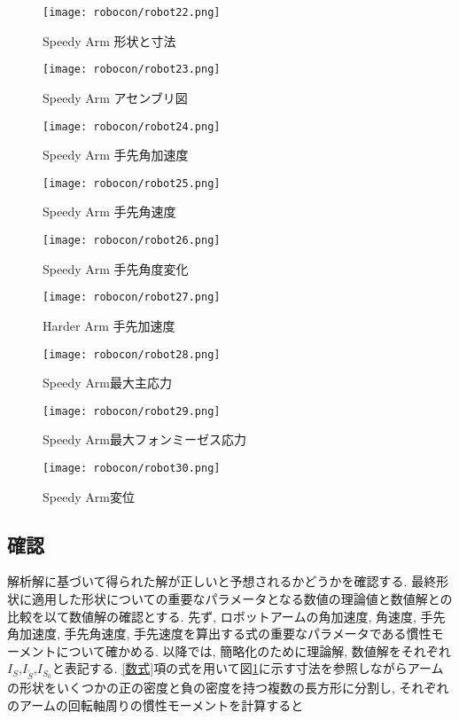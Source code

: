\documentclass[10pt,b5paper,papersize,dvipdfmx]{jsbook}
\begin{document}
\begin{figure}[htbp]
  \centering
  \texttt{[image: robocon/robot22.png]}
  \caption{Speedy Arm 形状と寸法}
  \label{fig:Speedy Arm 形状と寸法}
\end{figure}
\begin{figure}[htbp]
  \centering
  \texttt{[image: robocon/robot23.png]}
  \caption{Speedy Arm アセンブリ図}
  \label{fig:Speedy Arm アセンブリ図}
\end{figure}
\begin{figure}[htbp]
  \centering
  \texttt{[image: robocon/robot24.png]}
  \caption{Speedy Arm 手先角加速度}
  \label{fig:Speedy Arm 手先角加速度}
\end{figure}
\begin{figure}[htbp]
  \centering
  \texttt{[image: robocon/robot25.png]}
  \caption{Speedy Arm 手先角速度}
  \label{fig:Speedy Arm 手先角速度}
\end{figure}
\begin{figure}[htbp]
  \centering
  \texttt{[image: robocon/robot26.png]}
  \caption{Speedy Arm 手先角度変化}
  \label{fig:Speedy Arm 手先角度変化}
\end{figure}
\begin{figure}[htbp]
  \centering
  \texttt{[image: robocon/robot27.png]}
  \caption{Harder Arm 手先加速度}
  \label{fig:Harder Arm 手先加速度2}
\end{figure}
\begin{figure}[htbp]
  \centering
  \texttt{[image: robocon/robot28.png]}
  \caption{Speedy Arm最大主応力}
  \label{fig:Speedy Arm最大主応力}
\end{figure}
\begin{figure}[htbp]
  \centering
  \texttt{[image: robocon/robot29.png]}
  \caption{Speedy Arm最大フォンミーゼス応力}
  \label{fig:Speedy Arm最大フォンミーゼス応力}
\end{figure}
\begin{figure}[htbp]
  \centering
  \texttt{[image: robocon/robot30.png]}
  \caption{Speedy Arm変位}
  \label{fig:Speedy Arm変位}
\end{figure}
\subsection{確認}
解析解に基づいて得られた解が正しいと予想されるかどうかを確認する. 最終形状に適用した形状についての重要なパラメータとなる数値の理論値と数値解との比較を以て数値解の確認とする. 先ず, ロボットアームの角加速度, 角速度, 手先角加速度, 手先角速度, 手先速度を算出する式の重要なパラメータである慣性モーメントについて確かめる. 以降では, 簡略化のために理論解, 数値解をそれぞれ$I_S$,$I_{\tilde{S}}$,$I_{S_0}$と表記する. \ref{数式}項の式を用いて図\ref{fig:Speedy Arm 形状と寸法}に示す寸法を参照しながらアームの形状をいくつかの正の密度と負の密度を持つ複数の長方形に分割し, それぞれのアームの回転軸周りの慣性モーメントを計算すると
\end{document}
